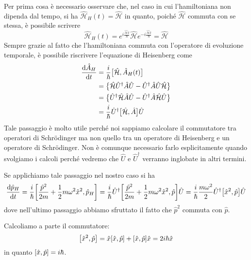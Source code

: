 \begin{soluzione}
   Per prima cosa è necessario osservare che, nel caso in cui l'hamiltoniana non dipenda dal tempo, si ha $\hat{\mathcal{H}}_H(t)=\hat{\mathcal{H}}$ in quanto, poiché $\hat{\mathcal{H}}$ commuta con se stessa, è possibile scrivere
   \begin{equation*}
      \hat{\mathcal{H}}_H(t)
      =e^{i\frac{\hat{\mathcal{H}} t}{\hbar}} \hat{\mathcal{H}} e^{-i\frac{\hat{\mathcal{H}} t}{\hbar}}
      =\hat{\mathcal{H}}
   \end{equation*}
   Sempre grazie al fatto che l'hamiltoniana commuta con l'operatore di evoluzione temporale, è possibile riscrivere l'equazione di Heisenberg come
   \begin{equation*}
      \begin{split}
         \dv{\hat{A}_H}{t}
         & =\frac{i}{\hbar} \bigl[ \hat{\mathcal{H}}, \hat{A}_H(t) \bigr]
         \\
         & =\bigl\{ \hat{\mathcal{H}}\hat{U}^{\dag}\hat{A}\hat{U} - \hat{U}^{\dag}\hat{A}\hat{U}\hat{\mathcal{H}} \bigr\}
         \\
         & =\bigl\{ \hat{U}^{\dag}\hat{\mathcal{H}}\hat{A}\hat{U} - \hat{U}^{\dag}\hat{A}\hat{\mathcal{H}}\hat{U} \bigr\}
         \\
         & =\frac{i}{\hbar} \hat{U}^{\dag} \bigl[ \hat{\mathcal{H}}, \hat{A} \bigr] \hat{U}
      \end{split}
   \end{equation*}
   Tale passaggio è molto utile perché noi sappiamo calcolare il commutatore tra operatori di Schrödinger ma non quello tra un operatore di Heisenberg e un operatore di Schrödinger. Non è comunque necessario farlo esplicitamente quando svolgiamo i calcoli perché vedremo che $\hat{U}$ e $\hat{U}^{\dag}$ verranno inglobate in altri termini.

   Se applichiamo tale passaggio nel nostro caso si ha
   \begin{equation*}
      \dv{\hat{p}_H}{t}
      =\frac{i}{\hbar} \qty[ \frac{\hat{p}^2}{2m} + \frac{1}{2} m \omega^2 \hat{x}^2, \hat{p}_H ]
      =\frac{i}{\hbar} \hat{U}^{\dag}\qty[ \frac{\hat{p}^2}{2m} + \frac{1}{2} m \omega^2 \hat{x}^2, \hat{p} ]\hat{U}
      =\frac{i}{\hbar} \frac{m \omega^2}{2} \hat{U}^{\dag}\qty[ \hat{x}^2, \hat{p} ]\hat{U}
   \end{equation*}
   dove nell'ultimo passaggio abbiamo sfruttato il fatto che $\hat{p}^2$ commuta con $\hat{p}$.

   Calcoliamo a parte il commutatore:
   \begin{equation*}
      \qty[ \hat{x}^2, \hat{p} ]
      =\hat{x}\qty[ \hat{x}, \hat{p} ] + \qty[ \hat{x}, \hat{p} ]\hat{x}
      =2 i\hbar \hat{x}
   \end{equation*}
   in quanto $\qty[ \hat{x}, \hat{p} ]=i\hbar$.


\end{soluzione}
